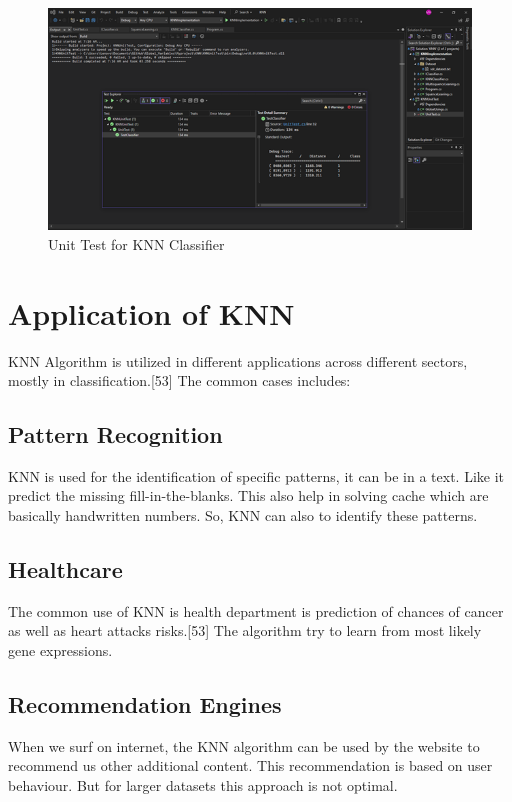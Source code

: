 \documentclass[conference]{IEEEtran}
\begin{document}
\begin{figure}
    \centering
    \includegraphics[width=1.0\linewidth]{Picture3.png}
    \caption{Unit Test for KNN Classifier}
    \label{fig:enter-label}
\end{figure}


\section{Application of KNN}
KNN Algorithm is utilized in different applications across different sectors, mostly in classification.[53] The common cases includes:


\subsection{Pattern Recognition}
KNN is used for the identification of specific patterns, it can be in a text. Like it predict the missing fill-in-the-blanks. This also help in solving cache which are basically handwritten numbers. So, KNN can also
to identify these patterns.


\subsection{Healthcare}
The common use of KNN is health department is prediction of chances of cancer as well as heart attacks risks.[53] The algorithm try to learn from most likely gene expressions. 

\subsection{Recommendation Engines}
When we surf on internet, the KNN algorithm can be used by the website to recommend us other additional content. This recommendation is based on user behaviour. But for larger datasets this approach is not optimal. 
\end{document}
